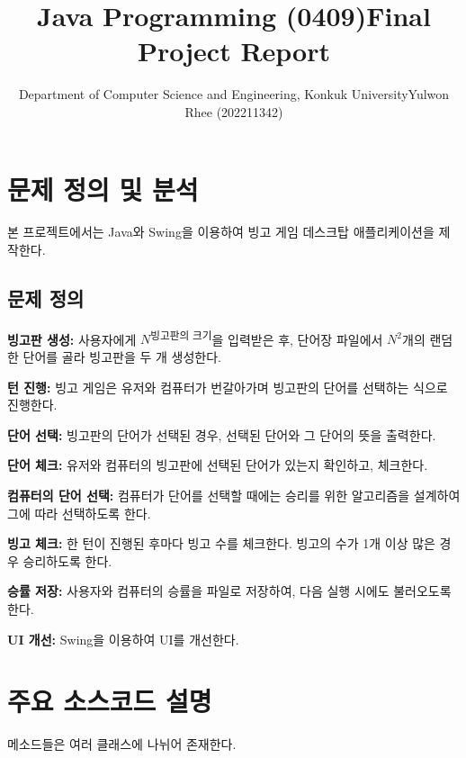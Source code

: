 



\title{Java Programming (0409)\newline\space Final Project Report}
\author{Department of Computer Science and Engineering, Konkuk University\newline Yulwon Rhee (202211342)}

\maketitle
\section{문제 정의 및 분석}
본 프로젝트에서는 Java와 Swing을 이용하여 빙고 게임 데스크탑 애플리케이션을 제작한다.

\subsection{문제 정의}
\textbf{빙고판 생성:}
사용자에게 $N$\textsuperscript{빙고판의 크기}을 입력받은 후, 단어장 파일에서 $N^2$개의 랜덤한 단어를 골라 빙고판을 두 개 생성한다.

\textbf{턴 진행:}
빙고 게임은 유저와 컴퓨터가 번갈아가며 빙고판의 단어를 선택하는 식으로 진행한다.

\textbf{단어 선택:}
빙고판의 단어가 선택된 경우, 선택된 단어와 그 단어의 뜻을 출력한다.

\textbf{단어 체크:}
유저와 컴퓨터의 빙고판에 선택된 단어가 있는지 확인하고, 체크한다.

\textbf{컴퓨터의 단어 선택:}
컴퓨터가 단어를 선택할 때에는 승리를 위한 알고리즘을 설계하여 그에 따라 선택하도록 한다.

\textbf{빙고 체크:}
한 턴이 진행된 후마다 빙고 수를 체크한다. 빙고의 수가 1개 이상 많은 경우 승리하도록 한다.

\textbf{승률 저장:}
사용자와 컴퓨터의 승률을 파일로 저장하여, 다음 실행 시에도 불러오도록 한다.

\textbf{UI 개선:}
Swing을 이용하여 UI를 개선한다.

\newpage
\section{주요 소스코드 설명}
메소드들은 여러 클래스에 나뉘어 존재한다.

